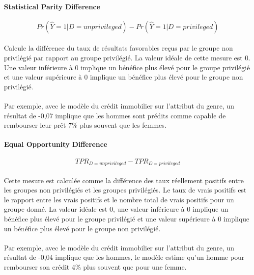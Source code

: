 \documentclass[10pt, french, a4paper]{report}
\begin{document}
\paragraph{Statistical Parity Difference}
\begin{equation}\label{eq:stat_par_diff}
  Pr(\hat{Y} = 1 | D = unprivileged) - Pr(\hat{Y} = 1 | D = privileged)
\end{equation}

\paragraph{}
Calcule la différence du taux de résultats favorables reçus par le groupe non privilégié par rapport au groupe privilégié. La valeur idéale de cette mesure est 0. Une valeur inférieure à 0 implique un bénéfice plus élevé pour le groupe privilégié et une valeur supérieure à 0 implique un bénéfice plus élevé pour le groupe non privilégié.

\paragraph{}
Par exemple, avec le modèle du crédit immobilier sur l'attribut du genre, un résultat de -0,07 implique que les hommes sont prédits comme capable de rembourser leur prêt 7\% plus souvent que les femmes.

\paragraph{Equal Opportunity Difference}

\begin{equation}\label{eq:eq_oppo_diff}
  TPR_{D = unprivileged} - TPR_{D = privileged}
\end{equation}

\paragraph{}
Cette mesure est calculée comme la différence des taux réellement positifs entre les groupes non privilégiés et les groupes privilégiés. Le taux de vrais positifs est le rapport entre les vrais positifs et le nombre total de vrais positifs pour un groupe donné. La valeur idéale est 0, une valeur inférieure à 0 implique un bénéfice plus élevé pour le groupe privilégié et une valeur supérieure à 0 implique un bénéfice plus élevé pour le groupe non privilégié.

\paragraph{}
Par exemple, avec le modèle du crédit immobilier sur l'attribut du genre, un résultat de -0,04 implique que les hommes, le modèle estime qu'un homme pour rembourser son crédit 4\%  plus souvent que pour une femme.
\end{document}
